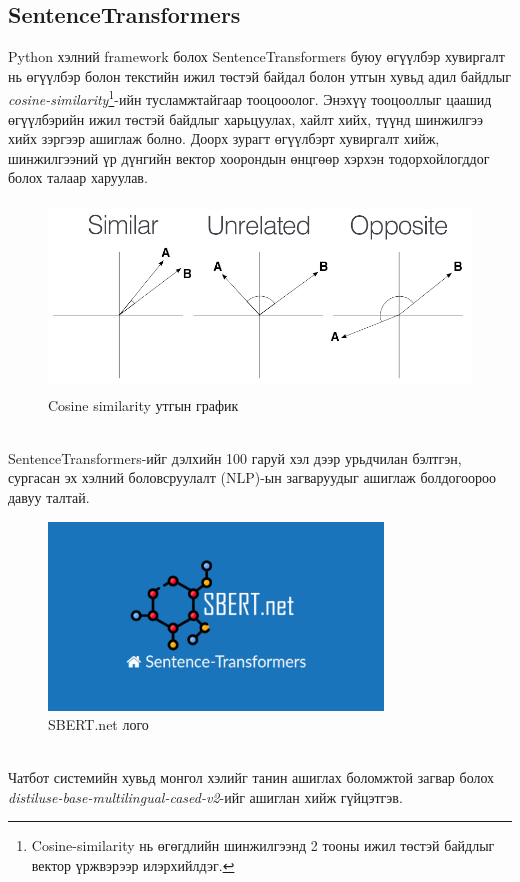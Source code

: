 \subsection{SentenceTransformers}
Python хэлний framework болох SentenceTransformers \cite{sentenceTransform} буюу өгүүлбэр хувиргалт нь өгүүлбэр болон текстийн ижил төстэй байдал болон утгын хувьд адил байдлыг \textit{cosine-similarity}\footnote{Cosine-similarity нь өгөгдлийн шинжилгээнд 2 тооны ижил төстэй байдлыг вектор үржвэрээр илэрхийлдэг.}-ийн тусламжтайгаар тооцооолог. Энэхүү тооцооллыг цаашид өгүүлбэрийн ижил төстэй байдлыг харьцуулах, хайлт хийх, түүнд шинжилгээ хийх зэргээр ашиглаж болно. Доорх зурагт өгүүлбэрт хувиргалт хийж, шинжилгээний үр дүнгийн вектор хоорондын өнцгөөр хэрхэн тодорхойлогддог болох талаар харуулав.
\begin{figure}[ht]
  \centering
  \includegraphics[height=5cm]{images/cosineSimilarity.png}
  \caption{Cosine similarity утгын график}
  \label{fig:cosineSimilarity}
\end{figure}
\\SentenceTransformers-ийг дэлхийн 100 гаруй хэл дээр урьдчилан бэлтгэн, сургасан эх хэлний боловсруулалт (NLP)-ын загваруудыг ашиглаж болдогоороо давуу талтай.
\begin{figure}[ht]
  \centering 
  \includegraphics[height=5cm]{images/sbertLogo.png}
  \caption{SBERT.net лого}
  \label{fig:sbertLogo}
\end{figure}
\\Чатбот системийн хувьд монгол хэлийг танин ашиглах боломжтой загвар болох \textit{distiluse-base-multilingual-cased-v2}\cite{sbert}-ийг ашиглан хийж гүйцэтгэв.
